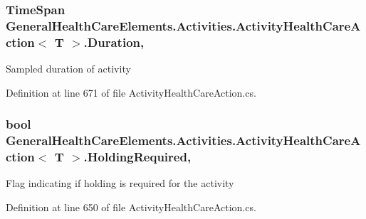 \subsubsection[{\texorpdfstring{Duration}{Duration}}]{\setlength{\rightskip}{0pt plus 5cm}Time\+Span {\bf General\+Health\+Care\+Elements.\+Activities.\+Activity\+Health\+Care\+Action}$<$ T $>$.Duration\hspace{0.3cm}{\ttfamily [get]}, {\ttfamily [set]}}\hypertarget{class_general_health_care_elements_1_1_activities_1_1_activity_health_care_action_a8fa307d9481cb9e94b623fc71c467116}{}\label{class_general_health_care_elements_1_1_activities_1_1_activity_health_care_action_a8fa307d9481cb9e94b623fc71c467116}


Sampled duration of activity 



Definition at line 671 of file Activity\+Health\+Care\+Action.\+cs.

\subsubsection[{\texorpdfstring{Holding\+Required}{HoldingRequired}}]{\setlength{\rightskip}{0pt plus 5cm}bool {\bf General\+Health\+Care\+Elements.\+Activities.\+Activity\+Health\+Care\+Action}$<$ T $>$.Holding\+Required\hspace{0.3cm}{\ttfamily [get]}, {\ttfamily [set]}}\hypertarget{class_general_health_care_elements_1_1_activities_1_1_activity_health_care_action_ad0642738e49577937983e95a73deca36}{}\label{class_general_health_care_elements_1_1_activities_1_1_activity_health_care_action_ad0642738e49577937983e95a73deca36}


Flag indicating if holding is required for the activity 



Definition at line 650 of file Activity\+Health\+Care\+Action.\+cs.

